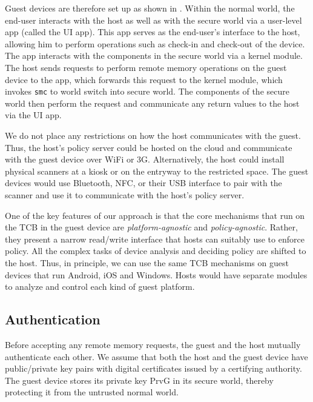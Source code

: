 Guest devices are therefore set up as shown in .  Within
the normal world, the end-user interacts with the host as well as with the
secure world via a user-level app (called the UI app).  This app serves as the
end-user's interface to the host, allowing him to perform operations such as
check-in and check-out of the device. The app interacts with the components in
the secure world via a kernel module. The host sends requests to perform remote
memory operations on the guest device to the app, which forwards this request
to the kernel module, which invokes \texttt{smc} to world switch into secure
world. The components of the secure world then perform the request and
communicate any return values to the host via the UI app. 

We do not place any restrictions on how the host communicates with the guest.
Thus, the host's policy server could be hosted on the cloud and communicate
with the guest device over WiFi or 3G. Alternatively, the host could install
physical scanners at a kiosk or on the entryway to the restricted space.  The
guest devices would use Bluetooth, NFC, or their USB interface to pair with the
scanner and use it to communicate with the host's policy server.

One of the key features of our approach is that the core mechanisms that run
on the TCB in the guest device are \textit{platform-agnostic} and
\textit{policy-agnostic}.  Rather, they present a narrow read/write interface
that hosts can suitably use to enforce policy. All the complex tasks of device
analysis and deciding policy are shifted to the host. Thus, in principle, we
can use the same TCB mechanisms on guest devices that run Android, iOS and
Windows. Hosts would have separate modules to analyze and control each kind of
guest platform.

\subsection{Authentication}
\label{section:mechanism:auth}
\newcommand{\ks}{$k_s$}
\newcommand{\pub}[1]{\textsf{Pub#1}}
\newcommand{\prv}[1]{\textsf{Prv#1}}
\newcommand{\enc}[2]{\textsf{Enc}$_{#1}$(#2)}
\newcommand{\cert}[1]{\textsf{Cert}(#1)}

Before accepting any remote memory requests, the guest and the host mutually
authenticate each other. We assume that both the host and the guest device have
public/private key pairs with digital certificates issued by a certifying
authority. The guest device stores its private key \prv{G} in its secure world,
thereby protecting it from the untrusted normal world. 


